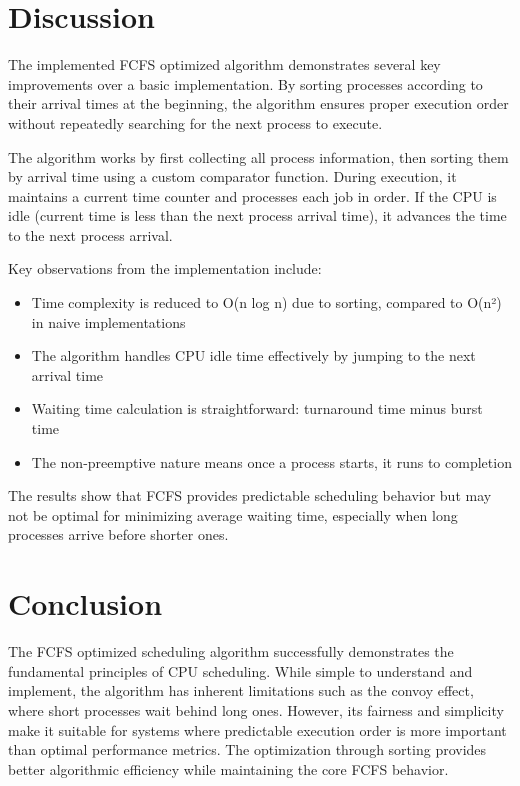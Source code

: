 \documentclass[12pt,a4paper]{article}
\begin{document}
\section{Discussion}
The implemented FCFS optimized algorithm demonstrates several key improvements over a basic implementation. By sorting processes according to their arrival times at the beginning, the algorithm ensures proper execution order without repeatedly searching for the next process to execute.

The algorithm works by first collecting all process information, then sorting them by arrival time using a custom comparator function. During execution, it maintains a current time counter and processes each job in order. If the CPU is idle (current time is less than the next process arrival time), it advances the time to the next process arrival.

Key observations from the implementation include:
\begin{itemize}
    \item Time complexity is reduced to O(n log n) due to sorting, compared to O(n²) in naive implementations
    \item The algorithm handles CPU idle time effectively by jumping to the next arrival time
    \item Waiting time calculation is straightforward: turnaround time minus burst time
    \item The non-preemptive nature means once a process starts, it runs to completion
\end{itemize}

The results show that FCFS provides predictable scheduling behavior but may not be optimal for minimizing average waiting time, especially when long processes arrive before shorter ones.

\section{Conclusion}
The FCFS optimized scheduling algorithm successfully demonstrates the fundamental principles of CPU scheduling. While simple to understand and implement, the algorithm has inherent limitations such as the convoy effect, where short processes wait behind long ones. However, its fairness and simplicity make it suitable for systems where predictable execution order is more important than optimal performance metrics. The optimization through sorting provides better algorithmic efficiency while maintaining the core FCFS behavior.
\end{document}
